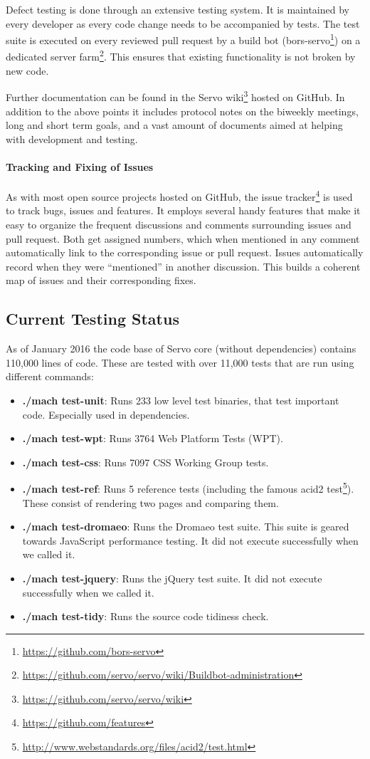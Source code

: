 \documentclass{scrartcl}
\begin{document}
Defect testing is done through an extensive testing system. It is maintained by every developer as every code change needs to be accompanied by tests. The test suite is executed on every reviewed pull request by a build bot (bors-servo\footnote{\url{https://github.com/bors-servo}}) on a dedicated server farm\footnote{\url{https://github.com/servo/servo/wiki/Buildbot-administration}}. This ensures that existing functionality is not broken by new code.

Further documentation can be found in the Servo wiki\footnote{\url{https://github.com/servo/servo/wiki}} hosted on GitHub. In addition to the above points it includes protocol notes on the biweekly meetings, long and short term goals, and a vast amount of documents aimed at helping with development and testing.

\paragraph{Tracking and Fixing of Issues}
As with most open source projects hosted on GitHub, the issue tracker\footnote{\url{https://github.com/features}} is used to track bugs, issues and features. It employs several handy features that make it easy to organize the frequent discussions and comments surrounding issues and pull request. Both get assigned numbers, which when mentioned in any comment automatically link to the corresponding issue or pull request. Issues automatically record when they were ``mentioned'' in another discussion. This builds a coherent map of issues and their corresponding fixes.

\subsection{Current Testing Status} \label{test_status}

As of January 2016 the code base of Servo core (without dependencies) contains 110,000 lines of code. These are tested with over 11,000 tests that are run using different commands:
\begin{itemize}
    \item \textbf{./mach test-unit}: Runs 233 low level test binaries, that test important code. Especially used in dependencies.
    \item \textbf{./mach test-wpt}: Runs 3764 Web Platform Tests (WPT). 
    \item \textbf{./mach test-css}: Runs 7097 CSS Working Group tests.
    \item \textbf{./mach test-ref}: Runs 5 reference tests (including the famous acid2 test\footnote{\url{http://www.webstandards.org/files/acid2/test.html}}). These consist of rendering two pages and comparing them.
    \item \textbf{./mach test-dromaeo}: Runs the Dromaeo test suite. This suite is geared towards JavaScript performance testing. It did not execute successfully when we called it.
    \item \textbf{./mach test-jquery}: Runs the jQuery test suite. It did not execute successfully when we called it.
    \item \textbf{./mach test-tidy}: Runs the source code tidiness check.
\end{itemize}
\end{document}
